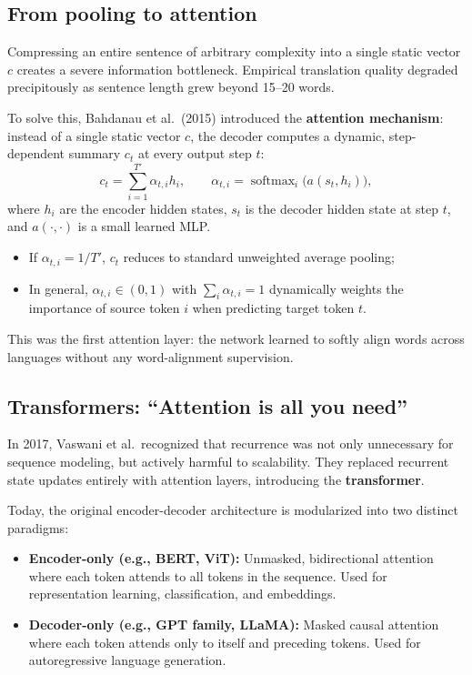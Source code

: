 \documentclass[11pt,a4paper]{article}
\DeclareMathOperator{\softmax}{softmax}
\newcommand{\slides}[1]{\par\nopagebreak\noindent{\normalfont\small\emph{(slides #1)}}\par\nopagebreak\vspace{2pt}}
\theoremstyle{definition}
\theoremstyle{plain}
\begin{document}
\subsection{From pooling to attention}\slides{19 / 84}
Compressing an entire sentence of arbitrary complexity into a single static vector $c$ creates a severe information bottleneck. Empirical translation quality degraded precipitously as sentence length grew beyond 15--20 words.

To solve this, Bahdanau et al.\ (2015) introduced the \textbf{attention mechanism}: instead of a single static vector $c$, the decoder computes a dynamic, step-dependent summary $c_t$ at every output step $t$:
\begin{equation}\label{eq:bahdanau}
c_t = \sum_{i=1}^{T'} \alpha_{t,i} h_i, \qquad \alpha_{t,i} = \softmax_i\big(a(s_t, h_i)\big),
\end{equation}
where $h_i$ are the encoder hidden states, $s_t$ is the decoder hidden state at step $t$, and $a(\cdot, \cdot)$ is a small learned MLP.
\begin{itemize}[nosep]
\item If $\alpha_{t,i} = 1/T'$, $c_t$ reduces to standard unweighted average pooling;
\item In general, $\alpha_{t,i} \in (0, 1)$ with $\sum_i \alpha_{t,i} = 1$ dynamically weights the importance of source token $i$ when predicting target token $t$.
\end{itemize}
This was the first attention layer: the network learned to softly align words across languages without any word-alignment supervision.

\subsection{Transformers: ``Attention is all you need''}\slides{20 / 84}
In 2017, Vaswani et al.\ recognized that recurrence was not only unnecessary for sequence modeling, but actively harmful to scalability. They replaced recurrent state updates entirely with attention layers, introducing the \textbf{transformer}.

Today, the original encoder-decoder architecture is modularized into two distinct paradigms:
\begin{itemize}
\item \textbf{Encoder-only (e.g., BERT, ViT):} Unmasked, bidirectional attention where each token attends to all tokens in the sequence. Used for representation learning, classification, and embeddings.
\item \textbf{Decoder-only (e.g., GPT family, LLaMA):} Masked causal attention where each token attends only to itself and preceding tokens. Used for autoregressive language generation.
\end{itemize}
\end{document}
